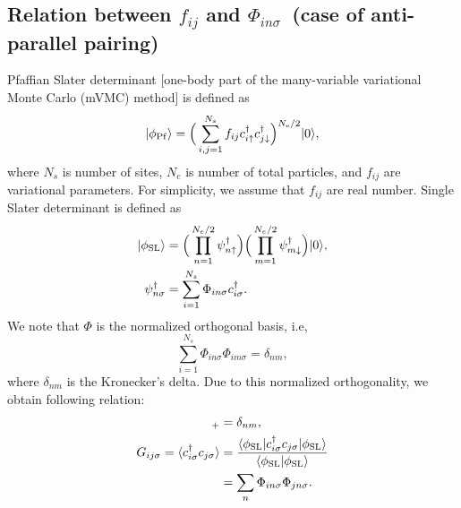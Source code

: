 \subsection{Relation between $f_{ij}$ and $\Phi_{in\sigma}$~(case of anti-parallel pairing)}
Pfaffian Slater determinant [one-body part of the many-variable variational Monte Carlo (mVMC) method]
is defined as
\begin{equation}
|\phi_{\rm Pf}\rangle=\Big(\sum_{i,j=1}^{N_{s}}f_{ij}c_{i\uparrow}^{\dagger}c_{j\downarrow}^{\dagger}\Big)^{N_{\rm e}/2}|0\rangle,
\end{equation}
where $N_{s}$ is number of sites, 
$N_{e}$ is number of total particles,
and $f_{ij}$ are variational parameters.
For simplicity, we assume that $f_{ij}$ are real number.
Single Slater determinant is defined as 
\begin{align}
|\phi_{\rm SL}\rangle&=\Big(\prod_{n=1}^{N_{e}/2}\psi_{n\uparrow}^{\dagger}\Big)
\Big(\prod_{m=1}^{N_{e}/2}\psi_{m\downarrow}^{\dagger}\Big)|0\rangle, \\
\psi_{n\sigma}^{\dagger}&=\sum_{i=1}^{N_{s}}\Phi_{in\sigma}c^{\dagger}_{i\sigma}.
\end{align}
We note that $\Phi$ is the normalized orthogonal basis, i.e, 
\begin{equation}
\sum_{i=1}^{N_{s}}\Phi_{in\sigma}\Phi_{im\sigma}=\delta_{nm},
\end{equation}
where $\delta_{nm}$ is the Kronecker's delta.
Due to this normalized orthogonality, we obtain 
following relation:
\begin{align}
[\psi^{\dagger}_{n\sigma},\psi_{m\sigma}]_{+}&=\delta_{nm},\\
G_{ij\sigma}=\langle c_{i\sigma}^{\dagger}c_{j\sigma}\rangle 
&=\frac{\langle \phi_{\rm SL}| c_{i\sigma}^{\dagger}c_{j\sigma} | \phi_{\rm SL}\rangle}{\langle \phi_{\rm SL}|\phi_{\rm SL}\rangle } \\
&=\sum_{n} \Phi_{in\sigma} \Phi_{jn\sigma}.
\end{align}


